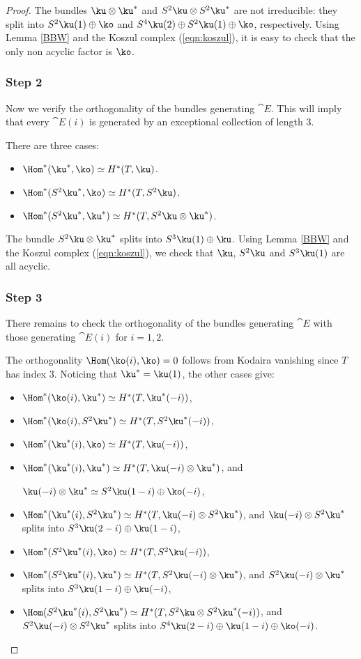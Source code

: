 \begin{proof}
The bundles $\ku \otimes \ku^*$ and $S^2\ku \otimes S^2\ku^*$ are not irreducible:
they split into \hbox{$S^2 \ku(1)\oplus \ko$} and $S^4 \ku (2) \oplus S^2 \ku (1)
\oplus \ko$, respectively.
Using Lemma \ref{BBW} and the Koszul complex (\ref{eqn:koszul}), it is easy to check that the only non acyclic factor is $\ko$.

\subsubsection*{Step 2}
Now we verify the orthogonality of the bundles generating $\cat{E}$. This will imply
that every $\cat{E}(i)$ is generated by an exceptional collection of length 3.

There are three cases:

\begin{itemize}
\item $\Hom^*(\ku^*,\ko) \simeq H^*(T,\ku)$.
\item $\Hom^*(S^2\ku^*,\ko) \simeq H^*(T,S^2\ku)$.
\item $\Hom^*(S^2\ku^*,\ku^*) \simeq H^*(T,S^2\ku\otimes\ku^*)$.
\end{itemize}

The bundle $S^2\ku \otimes\ku^*$ splits into $S^3 \ku (1) \oplus \ku$.
Using Lemma \ref{BBW} and the Koszul complex (\ref{eqn:koszul}), we check that $\ku$, $S^2\ku$ and $S^3 \ku (1)$ are all acyclic.

\subsubsection*{Step 3}
There remains to check the orthogonality of the bundles generating $\cat{E}$ with those generating $\cat{E}(i)$ for $i=1,2$.

The orthogonality $\Hom(\ko(i),\ko)=0$ follows from Kodaira vanishing since $T$ has index 3. Noticing that $\ku^*=\ku(1)$, the other cases give:

\begin{itemize}
\item $\Hom^*(\ko(i),\ku^*) \simeq H^*(T,\ku^*(-i))$,
\item $\Hom^*(\ko(i),S^2\ku^*) \simeq H^*(T,S^2\ku^*(-i))$,
\item $\Hom^*(\ku^*(i),\ko) \simeq H^*(T,\ku(-i))$,
\item $\Hom^*(\ku^*(i),\ku^*) \simeq H^*(T,\ku(-i) \otimes \ku^*)$, and\par\noindent$\ku(-i) \otimes \ku^* \simeq S^2 \ku (1-i) \oplus \ko(-i)$,
\item $\Hom^*(\ku^*(i),S^2\ku^*) \simeq H^*(T,\ku(-i) \otimes S^2\ku^*)$, and $\ku(-i) \otimes S^2\ku^*$ splits into $S^3 \ku(2-i)\oplus \ku (1-i)$,
\item $\Hom^*(S^2\ku^*(i),\ko) \simeq H^*(T,S^2\ku(-i))$,
\item $\Hom^*(S^2\ku^*(i),\ku^*) \simeq H^*(T,S^2\ku(-i) \otimes \ku^*)$, and $S^2\ku(-i) \otimes \ku^*$ splits into $S^3\ku (1-i) \oplus \ku(-i)$,
\item $\Hom(S^2\ku^*(i),S^2\ku^*) \simeq H^*(T,S^2\ku \otimes S^2 \ku^* (-i))$, and $S^2\ku(-i) \otimes S^2\ku^*$ splits into $S^4\ku (2-i)\oplus \ku(1-i)\oplus \ko(-i)$.
\end{itemize}


\end{proof}
